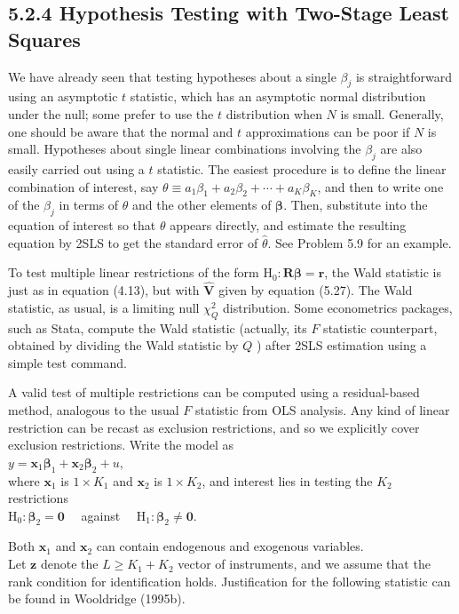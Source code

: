 \documentclass[10pt]{article}
\begin{document}
\subsection*{5.2.4 Hypothesis Testing with Two-Stage Least Squares}
We have already seen that testing hypotheses about a single $\beta_{j}$ is straightforward using an asymptotic $t$ statistic, which has an asymptotic normal distribution under the null; some prefer to use the $t$ distribution when $N$ is small. Generally, one should be aware that the normal and $t$ approximations can be poor if $N$ is small. Hypotheses about single linear combinations involving the $\beta_{j}$ are also easily carried out using a $t$ statistic. The easiest procedure is to define the linear combination of interest, say $\theta \equiv a_{1} \beta_{1}+a_{2} \beta_{2}+\cdots+a_{K} \beta_{K}$, and then to write one of the $\beta_{j}$ in terms of $\theta$ and the other elements of $\boldsymbol{\beta}$. Then, substitute into the equation of interest so that $\theta$ appears directly, and estimate the resulting equation by 2SLS to get the standard error of $\hat{\theta}$. See Problem 5.9 for an example.

To test multiple linear restrictions of the form $\mathrm{H}_{0}: \mathbf{R} \boldsymbol{\beta}=\mathbf{r}$, the Wald statistic is just as in equation (4.13), but with $\hat{\mathbf{V}}$ given by equation (5.27). The Wald statistic, as usual, is a limiting null $\chi_{Q}^{2}$ distribution. Some econometrics packages, such as Stata, compute the Wald statistic (actually, its $F$ statistic counterpart, obtained by dividing the Wald statistic by $Q$ ) after 2SLS estimation using a simple test command.

A valid test of multiple restrictions can be computed using a residual-based method, analogous to the usual $F$ statistic from OLS analysis. Any kind of linear restriction can be recast as exclusion restrictions, and so we explicitly cover exclusion restrictions. Write the model as\\
$y=\mathbf{x}_{1} \boldsymbol{\beta}_{1}+\mathbf{x}_{2} \boldsymbol{\beta}_{2}+u$,\\
where $\mathbf{x}_{1}$ is $1 \times K_{1}$ and $\mathbf{x}_{2}$ is $1 \times K_{2}$, and interest lies in testing the $K_{2}$ restrictions\\
$\mathrm{H}_{0}: \boldsymbol{\beta}_{2}=\mathbf{0} \quad$ against $\quad \mathrm{H}_{1}: \boldsymbol{\beta}_{2} \neq \mathbf{0}$.

Both $\mathbf{x}_{1}$ and $\mathbf{x}_{2}$ can contain endogenous and exogenous variables.\\
Let $\mathbf{z}$ denote the $L \geq K_{1}+K_{2}$ vector of instruments, and we assume that the rank condition for identification holds. Justification for the following statistic can be found in Wooldridge (1995b).
\end{document}
